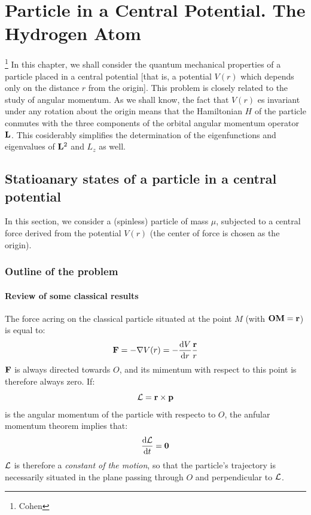 \chapter{Particle in a Central Potential. The Hydrogen Atom}\footnote{Cohen}
In this chapter, we shall consider the quantum mechanical properties of a particle placed in a central potential [that is, a potential $V(r)$ which depends only on the distance $r$ from the origin]. This problem is closely related to the study of angular momentum. As we shall know, the fact that $V(r)$ es invariant under any rotation about the origin means that the Hamiltonian $H$ of the particle conmutes with the three components of the orbital angular momentum operator $\vb{L}$. This cosiderably simplifies the determination of the eigenfunctions and eigenvalues of $\vb{L}^2$ and $L_z$ as well.



\section{Statioanary states of a particle in a central potential}\label{sec:A}
In this section, we consider a (spinless) particle of mass $\mu$, subjected to a central force derived from the potential $V(r)$ (the center of force is chosen as the origin).
\subsection{Outline of the problem}
\subsubsection{Review of some classical results}
The force acring on the classical particle situated at the point $M$ (with $\vb{OM}=\vb{r}$) is equal to:
\begin{equation}\label{A-1}
	\vb{F}=-\nabla V(r)=-\dv{V}{r}\frac{\vb{r}}{r}
\end{equation}
$\vb{F}$ is always directed towards $O$,  and its mimentum with respect to this point is therefore always zero. If:
\begin{equation}\label{A-2}
	\vb{\mathcal{L}}=\vb{r}\times\vb{p}
\end{equation}
is the angular momentum of the particle with respecto to $O$, the anfular momentum theorem implies that:
\begin{equation}\label{A-3}
	\dv{\vb{\mathcal{L}}}{t}=\vb{0}
\end{equation}
$\vb{\mathcal{L}}$ is therefore a \textit{constant of the motion}, so that the particle's trajectory is necessarily situated in the plane passing through $O$ and perpendicular to $\vb{\mathcal{L}}$.

